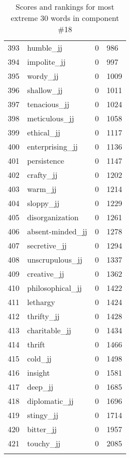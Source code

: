 \begin{longtable}[!htbp]{| rlr@{.}l |}
    393 & humble\_jj & 0 & 986 \\
    394 & impolite\_jj & 0 & 997 \\
    395 & wordy\_jj & 0 & 1009 \\
    396 & shallow\_jj & 0 & 1011 \\
    397 & tenacious\_jj & 0 & 1024 \\
    398 & meticulous\_jj & 0 & 1058 \\
    399 & ethical\_jj & 0 & 1117 \\
    400 & enterprising\_jj & 0 & 1136 \\
    401 & persistence & 0 & 1147 \\
    402 & crafty\_jj & 0 & 1202 \\
    403 & warm\_jj & 0 & 1214 \\
    404 & sloppy\_jj & 0 & 1229 \\
    405 & disorganization & 0 & 1261 \\
    406 & absent-minded\_jj & 0 & 1278 \\
    407 & secretive\_jj & 0 & 1294 \\
    408 & unscrupulous\_jj & 0 & 1337 \\
    409 & creative\_jj & 0 & 1362 \\
    410 & philosophical\_jj & 0 & 1422 \\
    411 & lethargy & 0 & 1424 \\
    412 & thrifty\_jj & 0 & 1428 \\
    413 & charitable\_jj & 0 & 1434 \\
    414 & thrift & 0 & 1466 \\
    415 & cold\_jj & 0 & 1498 \\
    416 & insight & 0 & 1581 \\
    417 & deep\_jj & 0 & 1685 \\
    418 & diplomatic\_jj & 0 & 1696 \\
    419 & stingy\_jj & 0 & 1714 \\
    420 & bitter\_jj & 0 & 1957 \\
    421 & touchy\_jj & 0 & 2085 \\
    \hline
    \caption{Scores and rankings for most extreme 30 words in component \#18} \\
\end{longtable}
